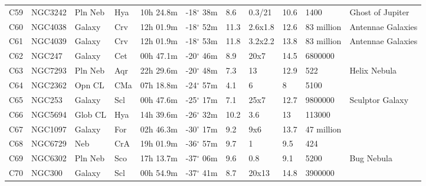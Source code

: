 \begin{longtable}{@{}lllllllllll@{}}
C59        & NGC3242     & Pln Neb    & Hya       & 10h 24.8m & -18$^{\circ}$ 38m  & 8.6       & 0.3/21               & 10.6     & 1400                & Ghost of Jupiter                \\
C60        & NGC4038     & Galaxy     & Crv       & 12h 01.9m & -18$^{\circ}$ 52m  & 11.3      & 2.6x1.8              & 12.6     & 83 million          & Antennae Galaxies               \\
C61        & NGC4039     & Galaxy     & Crv       & 12h 01.9m & -18$^{\circ}$ 53m  & 11.8      & 3.2x2.2              & 13.8     & 83 million          & Antennae Galaxies               \\
C62        & NGC247      & Galaxy     & Cet       & 00h 47.1m & -20$^{\circ}$ 46m  & 8.9       & 20x7                 & 14.5     & 6800000             &                                 \\
C63        & NGC7293     & Pln Neb    & Aqr       & 22h 29.6m & -20$^{\circ}$ 48m  & 7.3       & 13                   & 12.9     & 522                 & Helix Nebula                    \\
C64        & NGC2362     & Opn CL     & CMa       & 07h 18.8m & -24$^{\circ}$ 57m  & 4.1       & 6                    & 8        & 5100                &                                 \\
C65        & NGC253      & Galaxy     & Scl       & 00h 47.6m & -25$^{\circ}$ 17m  & 7.1       & 25x7                 & 12.7     & 9800000             & Sculptor Galaxy                 \\
C66        & NGC5694     & Glob CL    & Hya       & 14h 39.6m & -26$^{\circ}$ 32m  & 10.2      & 3.6                  & 13       & 113000              &                                 \\
C67        & NGC1097     & Galaxy     & For       & 02h 46.3m & -30$^{\circ}$ 17m  & 9.2       & 9x6                  & 13.7     & 47 million          &                                 \\
C68        & NGC6729     & Neb        & CrA       & 19h 01.9m & -36$^{\circ}$ 57m  & 9.7       & 1                    & 9.5      & 424                 &                                 \\
C69        & NGC6302     & Pln Neb    & Sco       & 17h 13.7m & -37$^{\circ}$ 06m  & 9.6       & 0.8                  & 9.1      & 5200                & Bug Nebula                      \\
C70        & NGC300      & Galaxy     & Scl       & 00h 54.9m & -37$^{\circ}$ 41m  & 8.7       & 20x13                & 14.8     & 3900000             &                                 \\

\end{longtable}
